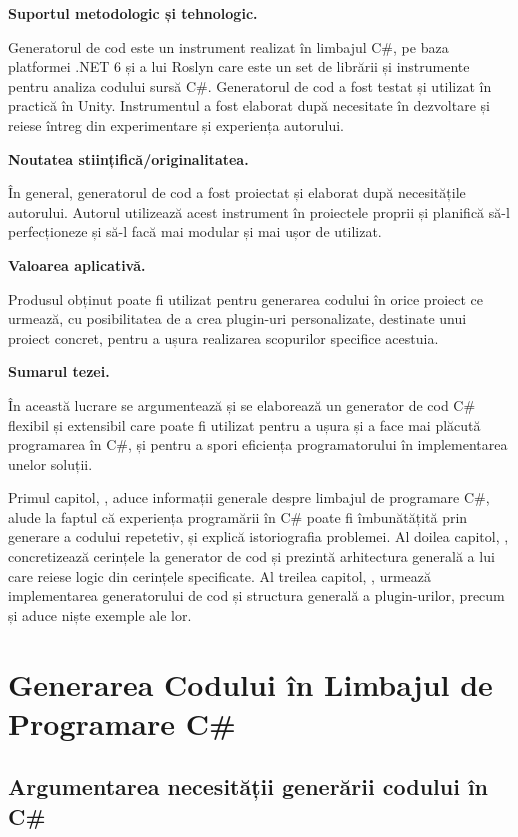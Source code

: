 \documentclass[a4paper,12pt]{report}
\def\oldchapter{} \let\oldchapter=\chapter{}
\def\chapter{\stepcounter{num_chapters}\oldchapter}
\begin{document}
\textbf{Suportul metodologic și tehnologic.}

Generatorul de cod este un instrument realizat în limbajul C\#, pe baza platformei {{.}NET} 6 și a lui Roslyn care este un set de librării și instrumente pentru analiza codului sursă C\#.
Generatorul de cod a fost testat și utilizat în practică în Unity.
Instrumentul a fost elaborat după necesitate în dezvoltare și reiese întreg din experimentare și experiența autorului.

\textbf{Noutatea stiințifică/originalitatea.}

În general, generatorul de cod a fost proiectat și elaborat după necesitățile autorului.
Autorul utilizează acest instrument în proiectele proprii și planifică să-l perfecționeze și să-l facă mai modular și mai ușor de utilizat.

\textbf{Valoarea aplicativă.}

Produsul obținut poate fi utilizat pentru generarea codului în orice proiect ce urmează,
cu posibilitatea de a crea plugin-uri personalizate, destinate unui proiect concret,
pentru a ușura realizarea scopurilor specifice acestuia.

\textbf{Sumarul tezei.}

În această lucrare se argumentează și se elaborează un generator de cod C\# flexibil și extensibil care poate fi utilizat pentru a ușura și a face mai plăcută programarea în C\#, și pentru a spori eficiența programatorului în implementarea unelor soluții.

Primul capitol, , aduce informații generale despre limbajul de programare C\#, alude la faptul că experiența programării în C\# poate fi îmbunătățită prin generare a codului repetetiv, și explică istoriografia problemei.
Al doilea capitol, , concretizează cerințele la generator de cod și prezintă arhitectura generală a lui care reiese logic din cerințele specificate.
Al treilea capitol, , urmează implementarea generatorului de cod și structura generală a plugin-urilor, precum și aduce niște exemple ale lor.


\chapter{Generarea Codului în Limbajul de Programare C\#}\label{intro_chapter_title}

\section{Argumentarea necesității generării codului în C\#}
\end{document}
